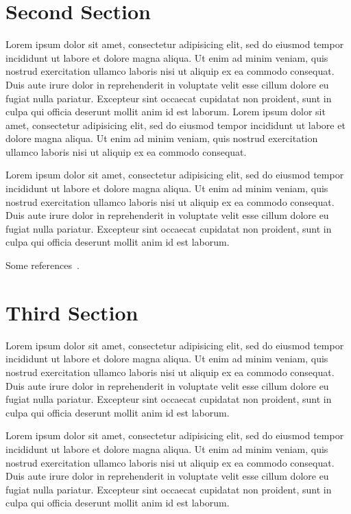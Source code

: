 \documentclass[a4paper, 10pt, twoside, dvipsnames]{article}
\begin{document}
\begin{multicols}{2}
\section{Second Section}
Lorem ipsum dolor sit amet, consectetur adipisicing elit, sed do eiusmod tempor incididunt ut labore et dolore magna aliqua. Ut enim ad minim veniam, quis nostrud exercitation ullamco laboris nisi ut aliquip ex ea commodo consequat. Duis aute irure dolor in reprehenderit in voluptate velit esse cillum dolore eu fugiat nulla pariatur. Excepteur sint occaecat cupidatat non proident, sunt in culpa qui officia deserunt mollit anim id est laborum. Lorem ipsum dolor sit amet, consectetur adipisicing elit, sed do eiusmod tempor incididunt ut labore et dolore magna aliqua. Ut enim ad minim veniam, quis nostrud exercitation ullamco laboris nisi ut aliquip ex ea commodo consequat. 

Lorem ipsum dolor sit amet, consectetur adipisicing elit, sed do eiusmod tempor incididunt ut labore et dolore magna aliqua. Ut enim ad minim veniam, quis nostrud exercitation ullamco laboris nisi ut aliquip ex ea commodo consequat. Duis aute irure dolor in reprehenderit in voluptate velit esse cillum dolore eu fugiat nulla pariatur. Excepteur sint occaecat cupidatat non proident, sunt in culpa qui officia deserunt mollit anim id est laborum. 

Some references~\cite{SMAD, Brown}.

\section{Third Section}
Lorem ipsum dolor sit amet, consectetur adipisicing elit, sed do eiusmod tempor incididunt ut labore et dolore magna aliqua. Ut enim ad minim veniam, quis nostrud exercitation ullamco laboris nisi ut aliquip ex ea commodo consequat. Duis aute irure dolor in reprehenderit in voluptate velit esse cillum dolore eu fugiat nulla pariatur. Excepteur sint occaecat cupidatat non proident, sunt in culpa qui officia deserunt mollit anim id est laborum.

Lorem ipsum dolor sit amet, consectetur adipisicing elit, sed do eiusmod tempor incididunt ut labore et dolore magna aliqua. Ut enim ad minim veniam, quis nostrud exercitation ullamco laboris nisi ut aliquip ex ea commodo consequat. Duis aute irure dolor in reprehenderit in voluptate velit esse cillum dolore eu fugiat nulla pariatur. Excepteur sint occaecat cupidatat non proident, sunt in culpa qui officia deserunt mollit anim id est laborum.


\end{multicols}
\end{document}
